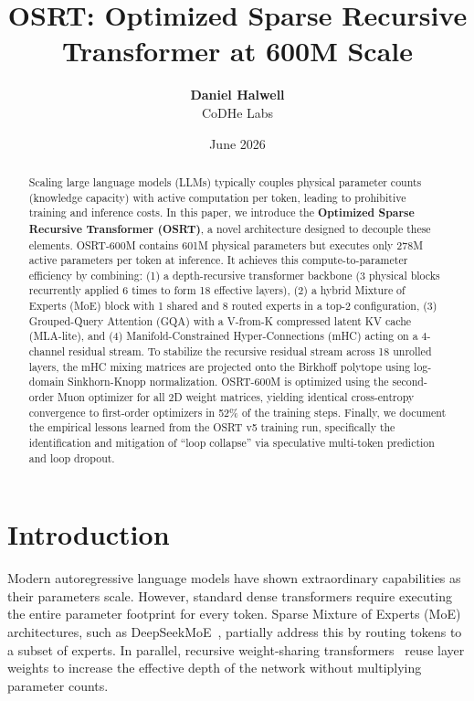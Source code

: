 \documentclass[11pt,twocolumn]{article}
\title{\textbf{OSRT: Optimized Sparse Recursive Transformer at 600M Scale}}
\author{
  \textbf{Daniel Halwell} \\
  CoDHe Labs
}
\date{June 2026}
\begin{document}
\maketitle

\begin{abstract}
Scaling large language models (LLMs) typically couples physical parameter counts (knowledge capacity) with active computation per token, leading to prohibitive training and inference costs. In this paper, we introduce the \textbf{Optimized Sparse Recursive Transformer (OSRT)}, a novel architecture designed to decouple these elements. OSRT-600M contains 601M physical parameters but executes only 278M active parameters per token at inference. It achieves this compute-to-parameter efficiency by combining: (1) a depth-recursive transformer backbone (3 physical blocks recurrently applied 6 times to form 18 effective layers), (2) a hybrid Mixture of Experts (MoE) block with 1 shared and 8 routed experts in a top-2 configuration, (3) Grouped-Query Attention (GQA) with a V-from-K compressed latent KV cache (MLA-lite), and (4) Manifold-Constrained Hyper-Connections (mHC) acting on a 4-channel residual stream. To stabilize the recursive residual stream across 18 unrolled layers, the mHC mixing matrices are projected onto the Birkhoff polytope using log-domain Sinkhorn-Knopp normalization. OSRT-600M is optimized using the second-order Muon optimizer for all 2D weight matrices, yielding identical cross-entropy convergence to first-order optimizers in 52\% of the training steps. Finally, we document the empirical lessons learned from the OSRT v5 training run, specifically the identification and mitigation of ``loop collapse'' via speculative multi-token prediction and loop dropout.
\end{abstract}

\section{Introduction}
Modern autoregressive language models have shown extraordinary capabilities as their parameters scale. However, standard dense transformers require executing the entire parameter footprint for every token. Sparse Mixture of Experts (MoE) architectures, such as DeepSeekMoE~\cite{deepseekmoe2024}, partially address this by routing tokens to a subset of experts. In parallel, recursive weight-sharing transformers~\cite{albert2019} reuse layer weights to increase the effective depth of the network without multiplying parameter counts.
\end{document}
